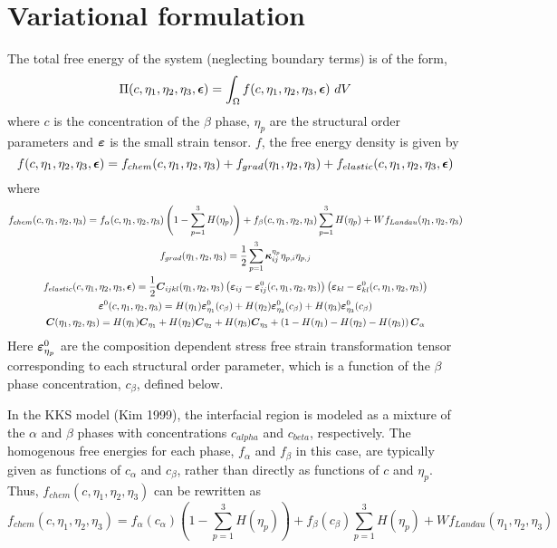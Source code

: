 \documentclass[11pt]{article}
\renewcommand{\=}[1]{\stackrel{#1}{=}} %
\theoremstyle{definition}
\theoremstyle{remark}
\def\Bepsilon{\mbox{\boldmath$\epsilon$}}
\def\Bkappa{\mbox{\boldmath$\kappa$}}
\def\Bvarepsilon{\mbox{\boldmath$\varepsilon$}}
\def\bC{\mbox{\boldmath$ C$}}
\begin{document}
\section{Variational formulation}
The total free energy of the system (neglecting boundary terms) is of the form,
\begin{equation}
\Pi(c, \eta_1, \eta_2, \eta_3, \Bepsilon) = \int_{\Omega} f(c, \eta_1, \eta_2, \eta_3, \Bepsilon) ~dV 
\end{equation}
where $c$ is the concentration of the $\beta$ phase, $\eta_p$ are the structural order parameters and $\Bvarepsilon$ is the small strain tensor. $f$, the free energy density is given by
\begin{equation}
 f(c, \eta_1, \eta_2, \eta_3, \Bepsilon) =   f_{chem}(c, \eta_1, \eta_2, \eta_3) + f_{grad}(\eta_1, \eta_2, \eta_3) + f_{elastic}(c,\eta_1, \eta_2, \eta_3,\Bepsilon)
\end{equation}
where
\begin{gather}
f_{chem}(c, \eta_1, \eta_2, \eta_3) = f_{\alpha}(c,\eta_1, \eta_2, \eta_3) \left( 1- \sum_{p=1}^3 H(\eta_p)\right) + f_{\beta}(c,\eta_1, \eta_2, \eta_3) \sum_{p=1}^3 H(\eta_p)+ W f_{Landau}(\eta_1, \eta_2, \eta_3) \\
f_{grad}(\eta_1, \eta_2, \eta_3) = \frac{1}{2} \sum_{p=1}^3 \Bkappa^{\eta_p}_{ij} \eta_{p,i}  \eta_{p,j} \\
f_{elastic}(c,\eta_1, \eta_2, \eta_3,\Bepsilon) = \frac{1}{2} \bC_{ijkl}(\eta_1, \eta_2, \eta_3)  \left( \Bvarepsilon_{ij} - \Bvarepsilon ^0_{ij}(c, \eta_1, \eta_2, \eta_3) \right)\left( \Bvarepsilon_{kl} - \Bvarepsilon^0_{kl}(c, \eta_1, \eta_2, \eta_3)\right) \\
\Bvarepsilon^0(c, \eta_1, \eta_2, \eta_3) = H(\eta_1) \Bvarepsilon^0_{\eta_1} (c_{\beta})+ H(\eta_2) \Bvarepsilon^0_{\eta_2} (c_{\beta}) + H(\eta_3) \Bvarepsilon^0_{\eta_3} (c_{\beta}) \\
\bC(\eta_1, \eta_2, \eta_3) = H(\eta_1) \bC_{\eta_1}+ H(\eta_2) \bC_{\eta_2} + H(\eta_3) \bC_{\eta_3} + \left( 1- H(\eta_1)-H(\eta_2)-H(\eta_3)\right)  \bC_{\alpha}
\end{gather}
Here $\Bvarepsilon^0_{\eta_p}$ are the composition dependent stress free strain transformation tensor corresponding to each structural order parameter, which is a function of the $\beta$ phase concentration, $c_{\beta}$, defined below.

In the KKS model (Kim 1999), the interfacial region is modeled as a mixture of the $\alpha$ and $\beta$ phases with concentrations $c_{alpha}$ and $c_{beta}$, respectively. The homogenous free energies for each phase, $f_{\alpha}$ and $f_{\beta}$ in this case, are typically given as functions of $c_{\alpha}$ and $c_{\beta}$, rather than directly as functions of $c$ and $\eta_p$. Thus, $f_{chem}(c, \eta_1, \eta_2, \eta_3)$ can be rewritten as 
\begin{equation}
f_{chem}(c, \eta_1, \eta_2, \eta_3) = f_{\alpha}(c_{\alpha}) \left( 1- \sum_{p=1}^3 H(\eta_p)\right) + f_{\beta}(c_{\beta}) \sum_{p=1}^3 H(\eta_p)+ W f_{Landau}(\eta_1, \eta_2, \eta_3) 
\end{equation}
\end{document}
